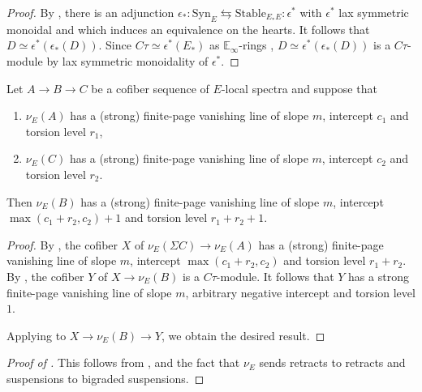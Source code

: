 \begin{proof}
        By \cite[Lemmas 4.42 and 4.43]{Pstragowski}, there is an adjunction $\epsilon_* : \mathrm{Syn}_E \leftrightarrows \mathrm{Stable}_{E_* E} : \epsilon^*$ with $\epsilon^*$ lax symmetric monoidal and which induces an equivalence on the hearts. It follows that $D \simeq \epsilon^* (\epsilon_* (D))$. Since $C\tau \simeq \epsilon^* (E_*)$ as $\mathbb{E}_{\infty}$-rings \cite[Corollary 4.45]{Pstragowski}, $D \simeq \epsilon^* (\epsilon_* (D))$ is a $C\tau$-module by lax symmetric monoidality of $\epsilon^*$.
%
\end{proof}

\begin{cor}\label{cor:HPS}
	Let $A \to B \to C$ be a cofiber sequence of $E$-local spectra and suppose that
	\begin{enumerate}
		\item $\nu_E (A)$ has a (strong) finite-page vanishing line of slope $m$, intercept $c_1$ and torsion level $r_1$,
		\item $\nu_E (C)$ has a (strong) finite-page vanishing line of slope $m$, intercept $c_2$ and torsion level $r_2$.
	\end{enumerate}
	Then $\nu_E (B)$ has a (strong) finite-page vanishing line of slope $m$, intercept $\max(c_1+r_2, c_2)+1$ and torsion level $r_1 + r_2 + 1$.
\end{cor}

\begin{proof}
	By , the cofiber $X$ of $\nu_E (\Sigma C) \to \nu_E (A)$ has a (strong) finite-page vanishing line of slope $m$, intercept $\max(c_1+r_2, c_2)$ and torsion level $r_1 + r_2$. By , the cofiber $Y$ of $X \to \nu_E (B)$ is a $C\tau$-module. It follows that $Y$ has a strong finite-page vanishing line of slope $m$, arbitrary negative intercept and torsion level $1$.

	Applying  to $X \to \nu_E (B) \to Y$, we obtain the desired result.
\end{proof}

\begin{proof}[Proof of ]
	This follows from ,  and the fact that $\nu_E$ sends retracts to retracts and suspensions to bigraded suspensions.
\end{proof}

